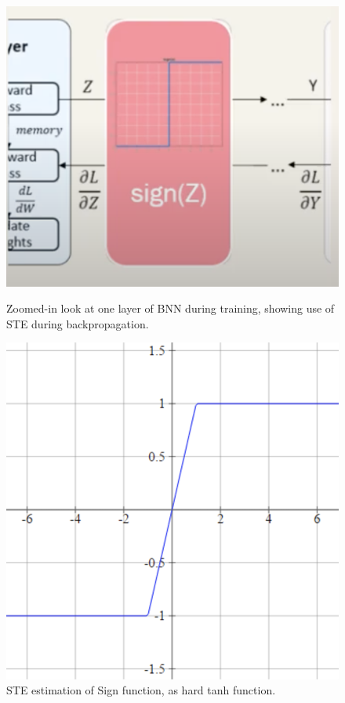 \begin{figure}[h]
    \centering
    \begin{minipage}{0.45\textwidth}
        \centering
        \includegraphics[width=\textwidth]{images/STE.png}
        \caption{Zoomed-in look at one layer of BNN during training, showing use of STE during backpropagation.}
    \end{minipage}\hfill
    \begin{minipage}{0.37\textwidth}
        \centering
        \includegraphics[width=\textwidth]{images/hard_tanh.png}
        \caption{STE estimation of Sign function, as hard tanh function.}
    \end{minipage}
\end{figure}


